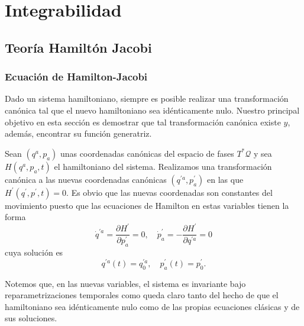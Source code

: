 \setchapterpreamble[u]{\margintoc}
\chapter{Integrabilidad}


\section{Teoría Hamiltón Jacobi}
\subsection{Ecuación de Hamilton-Jacobi}
Dado un sistema hamiltoniano, siempre es posible realizar una transformación canónica tal que el nuevo hamiltoniano sea idénticamente nulo. Nuestro principal objetivo en esta sección es demostrar que tal transformación canónica existe $y$, además, encontrar su función generatriz.

Sean $\left(q^{a}, p_{a}\right)$ unas coordenadas canónicas del espacio de fases $T^{*} \mathscr{Q}$ y sea $H\left(q^{a}, p_{a}, t\right)$ el hamiltoniano del sistema. Realizamos una transformación canónica a las nuevas coordenadas canónicas $\left(q^{\prime a}, p_{a}^{\prime}\right)$ en las que $H^{\prime}\left(q^{\prime}, p^{\prime}, t\right)=0$. Es obvio que las nuevas coordenadas son constantes del movimiento puesto que las ecuaciones de Hamilton en estas variables tienen la forma
$$
\dot{q}^{\prime a}=\frac{\partial H^{\prime}}{\partial p_{a}^{\prime}}=0, \quad \dot{p}_{a}^{\prime}=-\frac{\partial H^{\prime}}{\partial q^{\prime a}}=0
$$
cuya solución es
$$
q^{\prime a}(t)=q_{0}^{\prime a}, \quad p_{a}^{\prime}(t)=p_{0}^{\prime} .
$$

Notemos que, en las nuevas variables, el sistema es invariante bajo reparametrizaciones temporales como queda claro tanto del hecho de que el hamiltoniano sea idénticamente nulo como de las propias ecuaciones clásicas y de sus soluciones.

